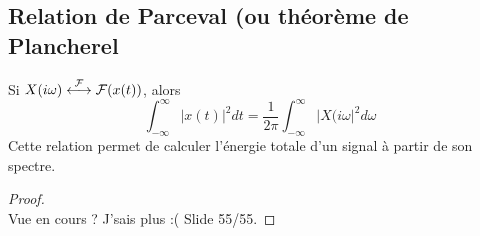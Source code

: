	
	
	\subsection{Relation de Parceval (ou théorème de Plancherel}	
	Si $X(i\omega) \ft \mathcal{F}(x(t))$, alors 
	\begin{equation}
	\int_{-\infty}^\infty |x(t)|^2 dt = \frac{1}{2\pi}\int_{-\infty}^\infty |X(i\omega|^2
	d\omega
	\end{equation}
	Cette relation permet de calculer l'énergie totale d'un signal à partir de son spectre.
	
	\begin{proof}\ \\
	Vue en cours ? J'sais plus :( Slide 55/55.
	\end{proof}
	
	
	
	
	
	
	
	
	
	
	
	
	
	
	
	
	
	
	
	
	
	
	
	
	
	
	
	
	
	
	
	
	
	
	
	